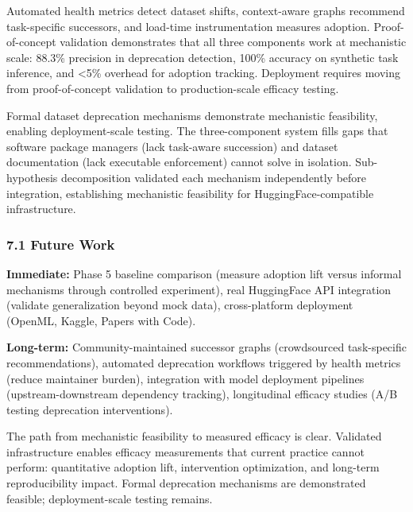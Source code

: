 
Automated health metrics detect dataset shifts, context-aware graphs recommend task-specific successors, and load-time instrumentation measures adoption. Proof-of-concept validation demonstrates that all three components work at mechanistic scale: 88.3\% precision in deprecation detection, 100\% accuracy on synthetic task inference, and <5\% overhead for adoption tracking. Deployment requires moving from proof-of-concept validation to production-scale efficacy testing.

Formal dataset deprecation mechanisms demonstrate mechanistic feasibility, enabling deployment-scale testing. The three-component system fills gaps that software package managers (lack task-aware succession) and dataset documentation (lack executable enforcement) cannot solve in isolation. Sub-hypothesis decomposition validated each mechanism independently before integration, establishing mechanistic feasibility for HuggingFace-compatible infrastructure.

\subsubsection{7.1 Future Work}

\textbf{Immediate:} Phase 5 baseline comparison (measure adoption lift versus informal mechanisms through controlled experiment), real HuggingFace API integration (validate generalization beyond mock data), cross-platform deployment (OpenML, Kaggle, Papers with Code).

\textbf{Long-term:} Community-maintained successor graphs (crowdsourced task-specific recommendations), automated deprecation workflows triggered by health metrics (reduce maintainer burden), integration with model deployment pipelines (upstream-downstream dependency tracking), longitudinal efficacy studies (A/B testing deprecation interventions).

The path from mechanistic feasibility to measured efficacy is clear. Validated infrastructure enables efficacy measurements that current practice cannot perform: quantitative adoption lift, intervention optimization, and long-term reproducibility impact. Formal deprecation mechanisms are demonstrated feasible; deployment-scale testing remains.
